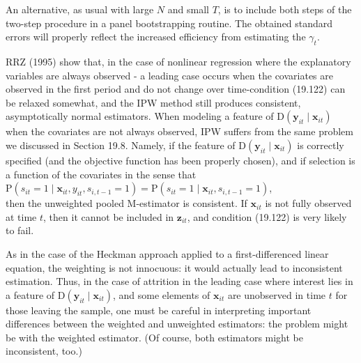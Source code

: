 \documentclass[10pt]{article}
\begin{document}
An alternative, as usual with large $N$ and small $T$, is to include both steps of the two-step procedure in a panel bootstrapping routine. The obtained standard errors will properly reflect the increased efficiency from estimating the $\gamma_{t}$.

RRZ (1995) show that, in the case of nonlinear regression where the explanatory variables are always observed - a leading case occurs when the covariates are observed in the first period and do not change over time-condition (19.122) can be relaxed somewhat, and the IPW method still produces consistent, asymptotically normal estimators. When modeling a feature of $\mathrm{D}\left(\mathbf{y}_{i t} \mid \mathbf{x}_{i t}\right)$ when the covariates are not always observed, IPW suffers from the same problem we discussed in Section 19.8. Namely, if the feature of $\mathrm{D}\left(\mathbf{y}_{i t} \mid \mathbf{x}_{i t}\right)$ is correctly specified (and the objective function has been properly chosen), and if selection is a function of the covariates in the sense that\\
$\mathrm{P}\left(s_{i t}=1 \mid \mathbf{x}_{i t}, y_{i t}, s_{i, t-1}=1\right)=\mathrm{P}\left(s_{i t}=1 \mid \mathbf{x}_{i t}, s_{i, t-1}=1\right)$,\\
then the unweighted pooled M-estimator is consistent. If $\mathbf{x}_{i t}$ is not fully observed at time $t$, then it cannot be included in $\mathbf{z}_{i t}$, and condition (19.122) is very likely to fail.

As in the case of the Heckman approach applied to a first-differenced linear equation, the weighting is not innocuous: it would actually lead to inconsistent estimation. Thus, in the case of attrition in the leading case where interest lies in a feature of $\mathrm{D}\left(\mathbf{y}_{i t} \mid \mathbf{x}_{i t}\right)$, and some elements of $\mathbf{x}_{i t}$ are unobserved in time $t$ for those leaving the sample, one must be careful in interpreting important differences between the weighted and unweighted estimators: the problem might be with the weighted estimator. (Of course, both estimators might be inconsistent, too.)
\end{document}
